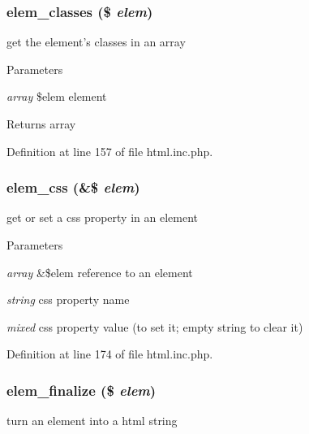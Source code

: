 \hypertarget{html_8inc_8php_a821651b8923938645b0b0fa6bb084522}{
\subsubsection[{elem\_\-classes}]{\setlength{\rightskip}{0pt plus 5cm}elem\_\-classes (\$ {\em elem})}}
\label{html_8inc_8php_a821651b8923938645b0b0fa6bb084522}
get the element's classes in an array


\begin{DoxyParams}{Parameters}
\item[{\em array}]\$elem element \end{DoxyParams}
\begin{DoxyReturn}{Returns}
array 
\end{DoxyReturn}


Definition at line 157 of file html.inc.php.

\hypertarget{html_8inc_8php_ac705ef06deb9e2d49e342ed78ecc1c9a}{
\subsubsection[{elem\_\-css}]{\setlength{\rightskip}{0pt plus 5cm}elem\_\-css (\&\$ {\em elem})}}
\label{html_8inc_8php_ac705ef06deb9e2d49e342ed78ecc1c9a}
get or set a css property in an element


\begin{DoxyParams}{Parameters}
\item[{\em array}]\&\$elem reference to an element \item[{\em string}]css property name \item[{\em mixed}]css property value (to set it; empty string to clear it) \end{DoxyParams}


Definition at line 174 of file html.inc.php.

\hypertarget{html_8inc_8php_af04b43a4dd09e73ca2cef84a4f2e9381}{
\subsubsection[{elem\_\-finalize}]{\setlength{\rightskip}{0pt plus 5cm}elem\_\-finalize (\$ {\em elem})}}
\label{html_8inc_8php_af04b43a4dd09e73ca2cef84a4f2e9381}
turn an element into a html string


